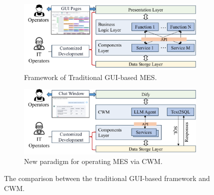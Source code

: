\documentclass[preprint,12pt]{elsarticle}
\begin{document}



\begin{figure}[t]
    \centering
    \begin{subfigure}{\textwidth}
    \centering
    \includegraphics[width=0.8\linewidth]{figs/MES.pdf}
    \caption{Framework of Traditional GUI-based MES.}
  \end{subfigure}

  \begin{subfigure}{\textwidth}
    \centering
    \includegraphics[width=0.8\linewidth]{figs/CWM.pdf}
    \caption{New paradigm for operating MES via CWM.}
  \end{subfigure}
    \caption{The comparison between the traditional GUI-based framework and CWM.}
    \label{fig:cmp_MES_CWM}
\end{figure}
\end{document}
